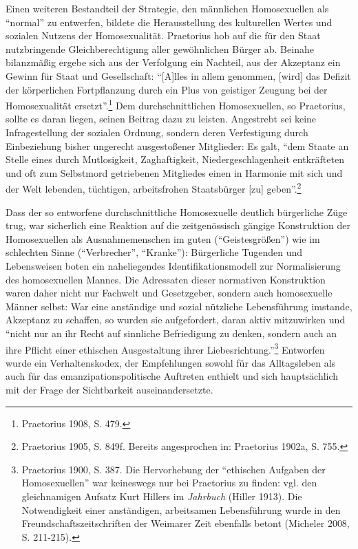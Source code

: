 \documentclass[a4paper,
fontsize=11pt,
oneside,
numbers=noperiodatend,
parskip=half-,
bibliography=totoc,
final
]{scrartcl}
\begin{document}
Einen weiteren Bestandteil der Strategie, den männlichen Homosexuellen
als \enquote{normal} zu entwerfen, bildete die Herausstellung des
kulturellen Wertes und sozialen Nutzens der Homosexualität. Praetorius
hob auf die für den Staat nutzbringende Gleichberechtigung aller
gewöhnlichen Bürger ab. Beinahe bilanzmäßig ergebe sich aus der
Verfolgung ein Nachteil, aus der Akzeptanz ein Gewinn für Staat und
Gesellschaft: \enquote{{[}A{]}lles in allem genommen, {[}wird{]} das
Defizit der körperlichen Fortpflanzung durch ein Plus von geistiger
Zeugung bei der Homosexualität ersetzt}.\footnote{Praetorius 1908, S.
  479.} Dem durchschnittlichen Homosexuellen, so Praetorius, sollte es
daran liegen, seinen Beitrag dazu zu leisten. Angestrebt sei keine
Infragestellung der sozialen Ordnung, sondern deren Verfestigung durch
Einbeziehung bisher ungerecht ausgestoßener Mitglieder: Es galt,
\enquote{dem Staate an Stelle eines durch Mutlosigkeit, Zaghaftigkeit,
Niedergeschlagenheit entkräfteten und oft zum Selbstmord getriebenen
Mitgliedes einen in Harmonie mit sich und der Welt lebenden, tüchtigen,
arbeitsfrohen Staatsbürger {[}zu{]} geben}.\footnote{Praetorius 1905, S.
  849f. Bereits angesprochen in: Praetorius 1902a, S. 755.}

Dass der so entworfene durchschnittliche Homosexuelle deutlich
bürgerliche Züge trug, war sicherlich eine Reaktion auf die
zeitgenössisch gängige Konstruktion der Homosexuellen als
Ausnahmemenschen im guten (\enquote{Geistesgrößen}) wie im schlechten
Sinne (\enquote{Verbrecher}, \enquote{Kranke}): Bürgerliche Tugenden und
Lebensweisen boten ein naheliegendes Identifikationsmodell zur
Normalisierung des homosexuellen Mannes. Die Adressaten dieser
normativen Konstruktion waren daher nicht nur Fachwelt und Gesetzgeber,
sondern auch homosexuelle Männer selbst: War eine anständige und sozial
nützliche Lebensführung imstande, Akzeptanz zu schaffen, so wurden sie
aufgefordert, daran aktiv mitzuwirken und \enquote{nicht nur an ihr
Recht auf sinnliche Befriedigung zu denken, sondern auch an ihre Pflicht
einer ethischen Ausgestaltung ihrer Liebesrichtung.}\footnote{Praetorius
  1900, S. 387. Die Hervorhebung der \enquote{ethischen Aufgaben der
  Homosexuellen} war keineswegs nur bei Praetorius zu finden: vgl. den
  gleichnamigen Aufsatz Kurt Hillers im \emph{Jahrbuch} (Hiller 1913).
  Die Notwendigkeit einer anständigen, arbeitsamen Lebensführung wurde
  in den Freundschaftszeitschriften der Weimarer Zeit ebenfalls betont
  (Micheler 2008, S. 211-215).} Entworfen wurde ein Verhaltenskodex, der
Empfehlungen sowohl für das Alltagsleben als auch für das
emanzipationspolitische Auftreten enthielt und sich hauptsächlich mit
der Frage der Sichtbarkeit auseinandersetzte.
\end{document}

